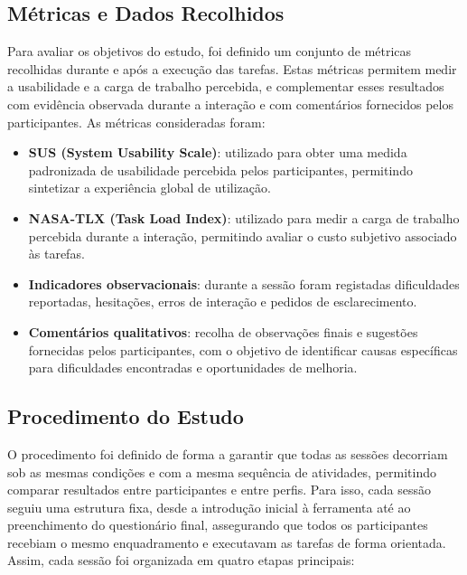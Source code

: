\subsection{Métricas e Dados Recolhidos}
\label{subsec:cap5_medicoes}

Para avaliar os objetivos do estudo, foi definido um conjunto de métricas recolhidas durante e após a execução das tarefas. Estas métricas permitem medir a usabilidade e a carga de trabalho percebida, e complementar esses resultados com evidência observada durante a interação e com comentários fornecidos pelos participantes. As métricas consideradas foram:

\begin{itemize}
    \item \textbf{SUS (System Usability Scale)}: utilizado para obter uma medida padronizada de usabilidade percebida pelos participantes, permitindo sintetizar a experiência global de utilização.
    \item \textbf{NASA-TLX (Task Load Index)}: utilizado para medir a carga de trabalho percebida durante a interação, permitindo avaliar o custo subjetivo associado às tarefas.
    \item \textbf{Indicadores observacionais}: durante a sessão foram registadas dificuldades reportadas, hesitações, erros de interação e pedidos de esclarecimento.
    \item \textbf{Comentários qualitativos}: recolha de observações finais e sugestões fornecidas pelos participantes, com o objetivo de identificar causas específicas para dificuldades encontradas e oportunidades de melhoria.
\end{itemize}

\subsection{Procedimento do Estudo}
\label{subsec:cap5_procedimento}

O procedimento foi definido de forma a garantir que todas as sessões decorriam sob as mesmas condições e com a mesma sequência de atividades, permitindo comparar resultados entre participantes e entre perfis. Para isso, cada sessão seguiu uma estrutura fixa, desde a introdução inicial à ferramenta até ao preenchimento do questionário final, assegurando que todos os participantes recebiam o mesmo enquadramento e executavam as tarefas de forma orientada. Assim, cada sessão foi organizada em quatro etapas principais:

